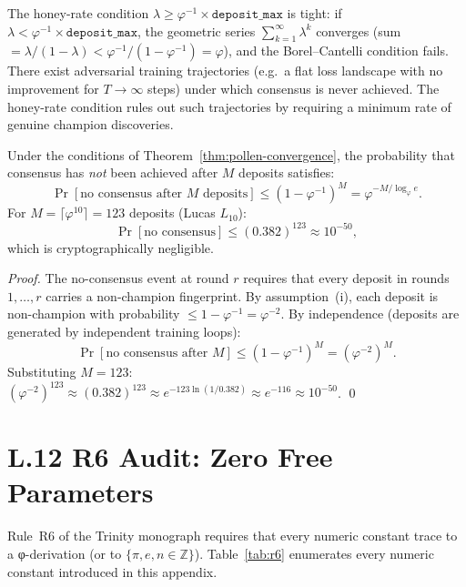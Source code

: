 \begin{remark}
The honey-rate condition $\lambda \geq \varphi^{-1} \times
\texttt{deposit\_max}$ is tight: if $\lambda < \varphi^{-1} \times
\texttt{deposit\_max}$, the geometric series
$\sum_{k=1}^{\infty} \lambda^{k}$ converges (sum $= \lambda/(1-\lambda)
< \varphi^{-1}/(1-\varphi^{-1}) = \varphi$), and the Borel--Cantelli
condition fails.  There exist adversarial training trajectories (e.g.\
a flat loss landscape with no improvement for $T \to \infty$ steps)
under which consensus is never achieved.  The honey-rate condition
rules out such trajectories by requiring a minimum rate of genuine
champion discoveries.
\end{remark}

\begin{corollary}\label{cor:conv-rate}
Under the conditions of Theorem~\ref{thm:pollen-convergence}, the
probability that consensus has \emph{not} been achieved after $M$
deposits satisfies:
\[
  \Pr[\text{no consensus after } M \text{ deposits}]
  \leq (1 - \varphi^{-1})^{M} = \varphi^{-M/\log_{\varphi}e}.
\]
For $M = \lceil \varphi^{10} \rceil = 123$ deposits (Lucas $L_{10}$):
\[
  \Pr[\text{no consensus}] \leq (0.382)^{123} \approx 10^{-50},
\]
which is cryptographically negligible.
\end{corollary}

\begin{proof}
The no-consensus event at round $r$ requires that every deposit in
rounds $1, \ldots, r$ carries a non-champion fingerprint.  By
assumption~(i), each deposit is non-champion with probability
$\leq 1 - \varphi^{-1} = \varphi^{-2}$.  By independence (deposits
are generated by independent training loops):
\[
  \Pr[\text{no consensus after } M] \leq (1 - \varphi^{-1})^{M}
  = (\varphi^{-2})^{M}.
\]
Substituting $M = 123$: $(\varphi^{-2})^{123} \approx (0.382)^{123}
\approx e^{-123 \ln(1/0.382)} \approx e^{-116} \approx 10^{-50}$.  \qed
\end{proof}

\section*{L.12 \quad R6 Audit: Zero Free Parameters}
\label{sec:appl-r6}

Rule~R6 of the Trinity monograph requires that every numeric constant
trace to a φ-derivation (or to $\{π, e, n \in \mathbb{Z}\}$).
Table~\ref{tab:r6} enumerates every numeric constant introduced in this
appendix.

